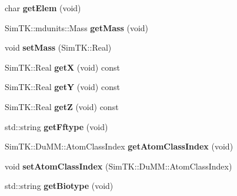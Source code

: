\begin{DoxyCompactItemize}
\item 
char {\bfseries get\+Elem} (void)\hypertarget{classbSpecificAtom_a504e6443b3544eab99dc540180e7faef}{}\label{classbSpecificAtom_a504e6443b3544eab99dc540180e7faef}

\item 
Sim\+T\+K\+::mdunits\+::\+Mass {\bfseries get\+Mass} (void)\hypertarget{classbSpecificAtom_aa1d62d9025250dd8b98edd6aec0a5ac0}{}\label{classbSpecificAtom_aa1d62d9025250dd8b98edd6aec0a5ac0}

\item 
void {\bfseries set\+Mass} (Sim\+T\+K\+::\+Real)\hypertarget{classbSpecificAtom_a6fe6f54164f5b5e2d7ab7bd83f51bd3f}{}\label{classbSpecificAtom_a6fe6f54164f5b5e2d7ab7bd83f51bd3f}

\item 
Sim\+T\+K\+::\+Real {\bfseries getX} (void) const \hypertarget{classbSpecificAtom_a5a76015f75f157c730bea365c376fca2}{}\label{classbSpecificAtom_a5a76015f75f157c730bea365c376fca2}

\item 
Sim\+T\+K\+::\+Real {\bfseries getY} (void) const \hypertarget{classbSpecificAtom_acf755933d67c16ab908cae10605b9517}{}\label{classbSpecificAtom_acf755933d67c16ab908cae10605b9517}

\item 
Sim\+T\+K\+::\+Real {\bfseries getZ} (void) const \hypertarget{classbSpecificAtom_a3330dd2b17b897482d4a774909545691}{}\label{classbSpecificAtom_a3330dd2b17b897482d4a774909545691}

\item 
std\+::string {\bfseries get\+Fftype} (void)\hypertarget{classbSpecificAtom_a4f563df7deef061ccec68f833471fbc1}{}\label{classbSpecificAtom_a4f563df7deef061ccec68f833471fbc1}

\item 
Sim\+T\+K\+::\+Du\+M\+M\+::\+Atom\+Class\+Index {\bfseries get\+Atom\+Class\+Index} (void)\hypertarget{classbSpecificAtom_a1a3ac2e75d5b733b2fe1e46d3ad29f67}{}\label{classbSpecificAtom_a1a3ac2e75d5b733b2fe1e46d3ad29f67}

\item 
void {\bfseries set\+Atom\+Class\+Index} (Sim\+T\+K\+::\+Du\+M\+M\+::\+Atom\+Class\+Index)\hypertarget{classbSpecificAtom_adad7423221246722d0399cddaea24abb}{}\label{classbSpecificAtom_adad7423221246722d0399cddaea24abb}

\item 
std\+::string {\bfseries get\+Biotype} (void)\hypertarget{classbSpecificAtom_a458c7ce1b6b9e375de892c6e0fc20903}{}\label{classbSpecificAtom_a458c7ce1b6b9e375de892c6e0fc20903}


\end{DoxyCompactItemize}
